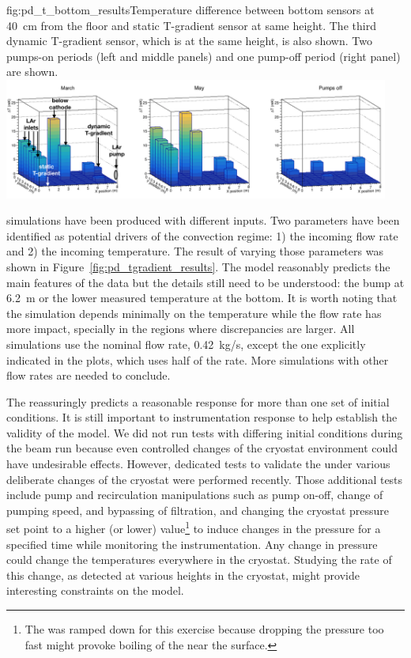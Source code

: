 \begin{dunefigure}{fig:pd_t_bottom_results}{Temperature difference between bottom sensors at 40~cm from the floor and static T-gradient sensor at same height. The third dynamic T-gradient sensor, which is  at the same height, is also shown. Two pumps-on periods (left and middle panels) and one pump-off period (right panel) are shown.}
  \includegraphics[width=0.95\textwidth]{graphics/cisc_t_bottom.png}%
\end{dunefigure}

 simulations have been produced with different inputs. Two parameters have been identified as potential drivers of the convection regime: 1) the incoming  flow rate and 2) the incoming  temperature. The result of varying those parameters was shown in Figure~\ref{fig:pd_tgradient_results}. 
The  model reasonably predicts the main features of the data but the details still need to be understood: the bump at 6.2~m or the lower measured temperature at the bottom. It is worth noting that the simulation depends minimally on the  temperature while the flow rate has more impact, specially in the regions where discrepancies are larger. All simulations use the nominal  flow rate, 0.42~kg/s, except the one explicitly indicated 
in the plots, which uses half of the rate. More simulations with other  flow rates are needed to conclude.  

The  reassuringly predicts a reasonable response for more than one set of initial conditions. It is still important to %
instrumentation response to help establish the validity of the  model. We did not run tests with differing initial conditions during the beam run because even controlled changes of the cryostat environment could have undesirable effects. However, dedicated tests to validate the  under various deliberate changes of the cryostat were performed recently. Those  additional tests include pump and recirculation manipulations such as pump on-off, change of pumping speed, and bypassing of filtration, and changing the cryostat pressure set point to a higher (or lower) value\footnote{The  %
was ramped down for this exercise because dropping the pressure too fast might provoke boiling of the  near the surface.} to induce changes in the pressure for a specified time while monitoring the instrumentation. Any change in pressure could change the temperatures everywhere in the cryostat. Studying the rate of this change, as detected at various heights in the cryostat, might provide interesting constraints on the  model.

